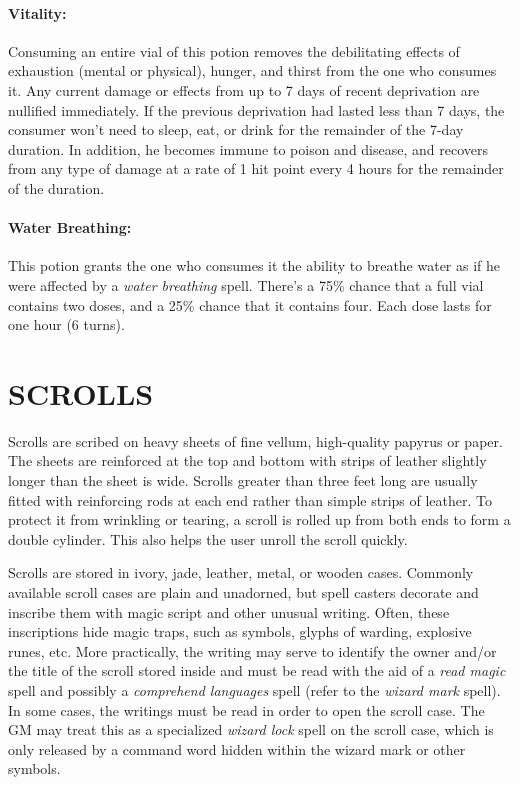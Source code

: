 \begin{multicols}{2}
\paragraph{Vitality:} Consuming an entire vial of this potion removes the debilitating effects of exhaustion (mental or physical), hunger, and thirst from the one who consumes it.  Any current damage or effects from up to 7 days of recent deprivation are nullified immediately.  If the previous deprivation had lasted less than 7 days, the consumer won't need to sleep, eat, or drink for the remainder of the 7-day duration.  In addition, he becomes immune to poison and disease, and recovers from any type of damage at a rate of 1 hit point every 4 hours for the remainder of the duration.

\paragraph{Water Breathing:} This potion grants the one who consumes it the ability to breathe water as if he were affected by a \textit{water breathing} spell.  There's a 75\% chance that a full vial contains two doses, and a 25\% chance that it contains four.  Each dose lasts for one hour (6 turns).

\section{SCROLLS}

Scrolls are scribed on heavy sheets of fine vellum, high-quality papyrus or paper.  The sheets are reinforced at the top and bottom with strips of leather slightly longer than the sheet is wide.  Scrolls greater than three feet long are usually fitted with reinforcing rods at each end rather than simple strips of leather.  To protect it from wrinkling or tearing, a scroll is rolled up from both ends to form a double cylinder.  This also helps the user unroll the scroll quickly.  

Scrolls are stored in ivory, jade, leather, metal, or wooden cases.  Commonly available scroll cases are plain and unadorned, but spell casters decorate and inscribe them with magic script and other unusual writing.  Often, these inscriptions hide magic traps, such as symbols, glyphs of warding, explosive runes, etc.  More practically, the writing may serve to identify the owner and/or the title of the scroll stored inside and must be read with the aid of a \textit{read magic} spell and possibly a \textit{comprehend languages} spell (refer to the \textit{wizard mark} spell).  In some cases, the writings must be read in order to open the scroll case.  The GM may treat this as a specialized \textit{wizard lock} spell on the scroll case, which is only released by a command word hidden within the wizard mark or other symbols.  


\end{multicols}
